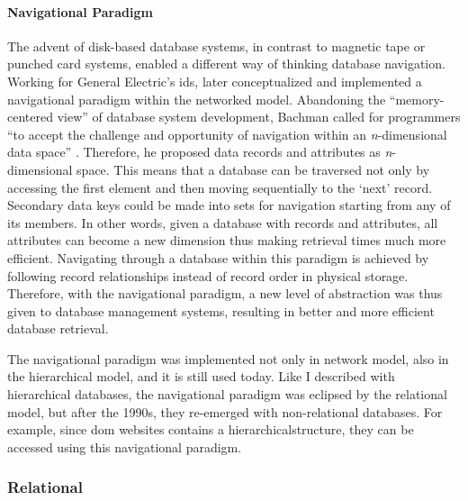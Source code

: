 \paragraph{Navigational Paradigm}  The advent of disk-based database systems, in contrast to magnetic tape or punched card systems, enabled a different way of thinking database navigation. Working for General Electric's \gls{ids}, \textcite{Bachman:1973:PN:355611.362534} later conceptualized and implemented a navigational paradigm within the networked model. Abandoning the ``memory-centered view'' of database system development, Bachman called for programmers ``to accept the challenge and opportunity of navigation within an \textit{n}-dimensional data space'' \parencite[657]{Bachman:1973:PN:355611.362534}. Therefore, he proposed data records and attributes as \textit{n}-dimensional space. This means that a database can be traversed not only by accessing the first element and then moving sequentially to the `next' record. Secondary data keys could be made into sets for navigation starting from any of its members. In other words, given a database with records and attributes, all attributes can become a new dimension thus making retrieval times much more efficient. Navigating through a database within this paradigm is achieved by following record relationships instead of record order in physical storage. Therefore, with the navigational paradigm, a new level of abstraction was thus given to database management systems, resulting in better and more efficient database retrieval.

The navigational paradigm was implemented not only in network model, also in the hierarchical model, and it is still used today. Like I described with hierarchical databases, the navigational paradigm was eclipsed by the relational model, but after the 1990s, they re-emerged with non-relational databases. For example, since \gls{dom} websites contains a hierarchicalstructure, they can be accessed using this navigational paradigm.

\subsubsection{Relational}
\label{model:relational}


